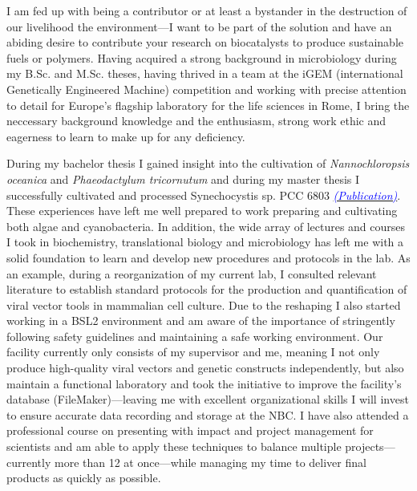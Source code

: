 \documentclass[11pt,a4paper,sans]{moderncv}
\begin{document}
       
\makelettertitle
\begin{spacing}{1.15}

I am fed up with being a contributor or at least a bystander in the destruction of our livelihood the environment---I want to be part of the solution and have an abiding desire to contribute your research on biocatalysts to produce sustainable fuels or polymers.
Having acquired a strong background in microbiology during my B.Sc. and M.Sc. theses, having thrived in a team at the iGEM (international Genetically Engineered Machine) competition and working with precise attention to detail for Europe's flagship laboratory for the life sciences in Rome, I bring the neccessary background knowledge and the enthusiasm, strong work ethic and eagerness to learn to make up for any deficiency. 
\par\vspace*{1mm} %

During my bachelor thesis I gained insight into the cultivation of \textit{Nannochloropsis oceanica} and \textit{Phaeodactylum tricornutum} and during my master thesis I successfully cultivated and processed Synechocystis sp. PCC 6803 {\href{https://www.ncbi.nlm.nih.gov/pubmed/29517395}{\textcolor{blue}{{\textit{(Publication)}}}}}. %
These experiences have left me well prepared to work preparing and cultivating both algae and cyanobacteria. %
In addition, the wide array of lectures and courses I took in biochemistry, translational biology and microbiology has  left me with a solid foundation to learn and develop new procedures and protocols in the lab. 
As an example, during a reorganization of my current lab, I consulted relevant literature to establish standard protocols for the production and quantification of viral vector tools in mammalian cell culture. 
Due to the reshaping I also started working in a BSL2 environment and am aware of the importance of stringently following safety guidelines and maintaining a safe working environment. 
Our facility currently only consists of my supervisor and me, meaning I not only produce high-quality viral vectors and genetic constructs independently, but also maintain a functional laboratory and took the initiative to improve the facility's database (FileMaker)---leaving me with excellent organizational skills I will invest to ensure accurate data recording and storage at the NBC.  
I have also attended a professional course on presenting with impact and project management for scientists and am able to apply these techniques to balance multiple projects---currently more than 12 at once---while managing my time to deliver final products as quickly as possible.


\end{spacing}
\end{document}
